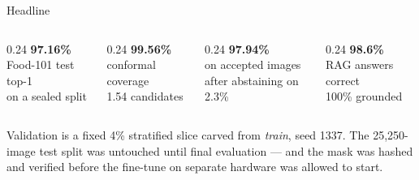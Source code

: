 \documentclass[aspectratio=169,11pt]{beamer}
\newcommand{\headline}[2]{%
  {\Huge\bfseries\color{comicred}#1}\\[0.15em]{\normalsize\color{dim}#2}}
\begin{document}
\begin{frame}{Headline}
\vspace{0.4em}
\begin{columns}[T]
\begin{column}{0.24\textwidth}\centering
\headline{97.16\%}{Food-101 test top-1\\on a sealed split}
\end{column}
\begin{column}{0.24\textwidth}\centering
\headline{99.56\%}{conformal coverage\\1.54 candidates}
\end{column}
\begin{column}{0.24\textwidth}\centering
\headline{97.94\%}{on accepted images\\after abstaining on 2.3\%}
\end{column}
\begin{column}{0.24\textwidth}\centering
\headline{98.6\%}{RAG answers correct\\100\% grounded}
\end{column}
\end{columns}
\vspace{1.6em}
{\color{dim} Validation is a fixed 4\% stratified slice carved from \emph{train}, seed 1337.
The 25{,}250-image test split was untouched until final evaluation --- and the mask was
hashed and verified before the fine-tune on separate hardware was allowed to start.}
\end{frame}
\end{document}
